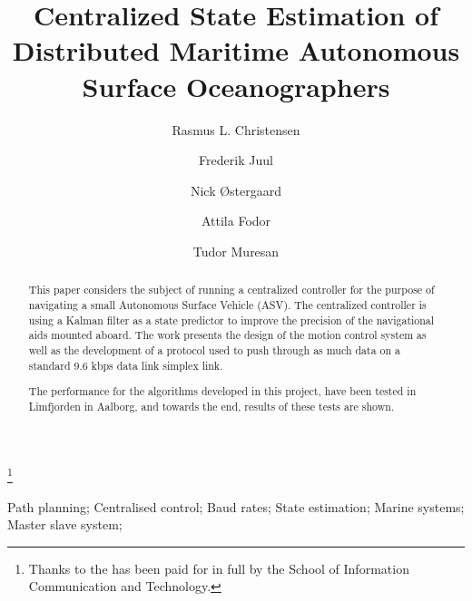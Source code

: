 \documentclass{ifacconf}
\begin{document}
\begin{frontmatter}

\title{Centralized State Estimation of Distributed Maritime Autonomous Surface Oceanographers} %

\thanks[footnoteinfo]{Thanks to the  has been paid for in full by the School of Information Communication and Technology.}

\author{Rasmus L. Christensen} 
\author{Frederik Juul} 
\author{Nick \O stergaard}
\author{Attila Fodor}
\author{Tudor Muresan}
\address{Section of Automation and Control, Department of Electronic Systems, Aalborg University, Fredrik Bajers Vej 7, 9220 Aalborg \O st, Denmark (e-mail: \{ralch,nickoe,fjuul,tmures12,afodor12\}@es.aau.dk)}                                            
          
\begin{keyword}                           %
Path planning; Centralised control; Baud rates; State estimation; Marine systems; Master slave system;              %
\end{keyword}                             %


\begin{abstract}                          %
This paper considers the subject of running a centralized controller for the purpose of navigating a small Autonomous Surface Vehicle (ASV). The centralized controller is using a Kalman filter as a state predictor to improve the precision of the navigational aids mounted aboard. The work presents the design of the motion control system as well as the development of a protocol used to push through as much data on a standard 9.6 kbps data link simplex link.

The performance for the algorithms developed in this project, have been tested in Limfjorden in Aalborg, and towards the end, results of these tests are shown. 
\end{abstract}

\end{frontmatter}
\end{document}
